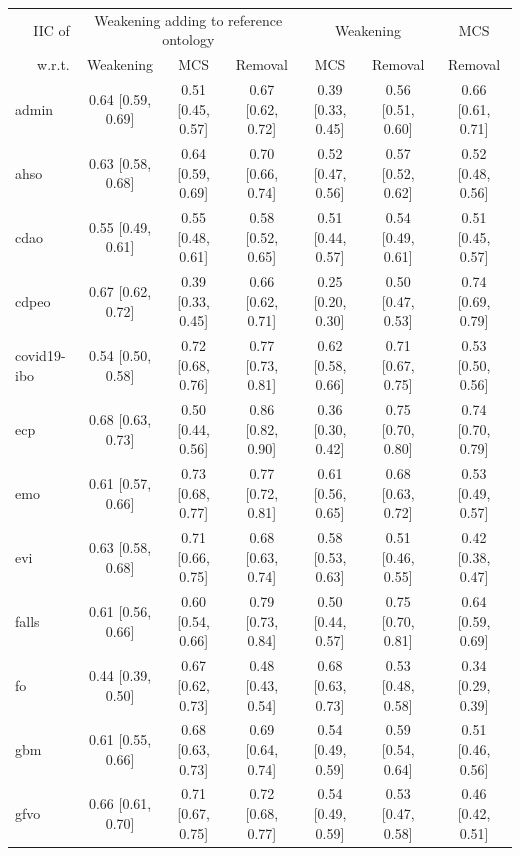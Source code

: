 \begin{table}[ht]
  \scriptsize
  \begin{widepage}
    \centering
    \begin{tabular}{|l|cccccc|}
      \cline{2-7}
      \multicolumn{1}{r|}{IIC of} & \multicolumn{3}{c}{Weakening adding to reference ontology} & \multicolumn{2}{c}{Weakening} & MCS \\
      \multicolumn{1}{r|}{w.r.t.} & Weakening & MCS & Removal & MCS & Removal & Removal \\
      \hline
      admin & 0.64 [0.59, 0.69] & 0.51 [0.45, 0.57] & 0.67 [0.62, 0.72] & 0.39 [0.33, 0.45] & 0.56 [0.51, 0.60] & 0.66 [0.61, 0.71] \\
      ahso & 0.63 [0.58, 0.68] & 0.64 [0.59, 0.69] & 0.70 [0.66, 0.74] & 0.52 [0.47, 0.56] & 0.57 [0.52, 0.62] & 0.52 [0.48, 0.56] \\
      cdao & 0.55 [0.49, 0.61] & 0.55 [0.48, 0.61] & 0.58 [0.52, 0.65] & 0.51 [0.44, 0.57] & 0.54 [0.49, 0.61] & 0.51 [0.45, 0.57] \\
      cdpeo & 0.67 [0.62, 0.72] & 0.39 [0.33, 0.45] & 0.66 [0.62, 0.71] & 0.25 [0.20, 0.30] & 0.50 [0.47, 0.53] & 0.74 [0.69, 0.79] \\
      covid19-ibo & 0.54 [0.50, 0.58] & 0.72 [0.68, 0.76] & 0.77 [0.73, 0.81] & 0.62 [0.58, 0.66] & 0.71 [0.67, 0.75] & 0.53 [0.50, 0.56] \\
      ecp & 0.68 [0.63, 0.73] & 0.50 [0.44, 0.56] & 0.86 [0.82, 0.90] & 0.36 [0.30, 0.42] & 0.75 [0.70, 0.80] & 0.74 [0.70, 0.79] \\
      emo & 0.61 [0.57, 0.66] & 0.73 [0.68, 0.77] & 0.77 [0.72, 0.81] & 0.61 [0.56, 0.65] & 0.68 [0.63, 0.72] & 0.53 [0.49, 0.57] \\
      evi & 0.63 [0.58, 0.68] & 0.71 [0.66, 0.75] & 0.68 [0.63, 0.74] & 0.58 [0.53, 0.63] & 0.51 [0.46, 0.55] & 0.42 [0.38, 0.47] \\
      falls & 0.61 [0.56, 0.66] & 0.60 [0.54, 0.66] & 0.79 [0.73, 0.84] & 0.50 [0.44, 0.57] & 0.75 [0.70, 0.81] & 0.64 [0.59, 0.69] \\
      fo & 0.44 [0.39, 0.50] & 0.67 [0.62, 0.73] & 0.48 [0.43, 0.54] & 0.68 [0.63, 0.73] & 0.53 [0.48, 0.58] & 0.34 [0.29, 0.39] \\
      gbm & 0.61 [0.55, 0.66] & 0.68 [0.63, 0.73] & 0.69 [0.64, 0.74] & 0.54 [0.49, 0.59] & 0.59 [0.54, 0.64] & 0.51 [0.46, 0.56] \\
      gfvo & 0.66 [0.61, 0.70] & 0.71 [0.67, 0.75] & 0.72 [0.68, 0.77] & 0.54 [0.49, 0.59] & 0.53 [0.47, 0.58] & 0.46 [0.42, 0.51] \\

\end{tabular}
\end{widepage}
\end{table}
